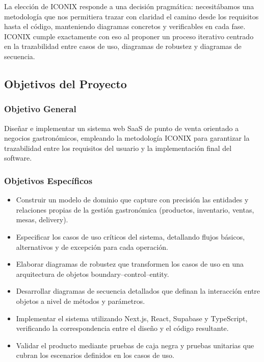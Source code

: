 \documentclass[12pt, a4paper]{article}
\begin{document}
La elección de ICONIX responde a una decisión pragmática: necesitábamos una metodología que nos permitiera trazar con claridad el camino desde los requisitos hasta el código, manteniendo diagramas concretos y verificables en cada fase. ICONIX cumple exactamente con eso al proponer un proceso iterativo centrado en la trazabilidad entre casos de uso, diagramas de robustez y diagramas de secuencia.

\subsection{Objetivos del Proyecto}

\subsubsection*{Objetivo General}

Diseñar e implementar un sistema web SaaS de punto de venta orientado a negocios gastronómicos, empleando la metodología ICONIX para garantizar la trazabilidad entre los requisitos del usuario y la implementación final del software.

\subsubsection*{Objetivos Específicos}

\begin{itemize}[leftmargin=2cm]
    \item Construir un modelo de dominio que capture con precisión las entidades y relaciones propias de la gestión gastronómica (productos, inventario, ventas, mesas, delivery).
    \item Especificar los casos de uso críticos del sistema, detallando flujos básicos, alternativos y de excepción para cada operación.
    \item Elaborar diagramas de robustez que transformen los casos de uso en una arquitectura de objetos boundary--control--entity.
    \item Desarrollar diagramas de secuencia detallados que definan la interacción entre objetos a nivel de métodos y parámetros.
    \item Implementar el sistema utilizando Next.js, React, Supabase y TypeScript, verificando la correspondencia entre el diseño y el código resultante.
    \item Validar el producto mediante pruebas de caja negra y pruebas unitarias que cubran los escenarios definidos en los casos de uso.
\end{itemize}
\end{document}
